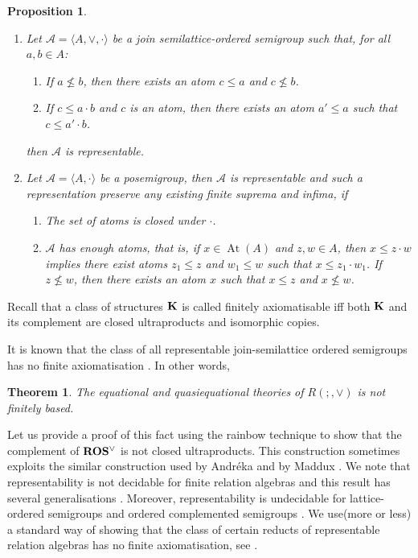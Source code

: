 \documentclass[a4paper]{article}
\theoremstyle{defin}
\theoremstyle{theorem}
\newtheorem{theorem}{Theorem}
\theoremstyle{prop}
\newtheorem{prop}{Proposition}
\theoremstyle{lemma}
\theoremstyle{ex}
\theoremstyle{col}
\begin{document}
\begin{prop}
  $ $

  \begin{enumerate}
    \item Let $\mathcal{A} = \langle A, \vee, \cdot \rangle$ be a join semilattice-ordered semigroup such that, for all $a, b \in A$:
    \begin{enumerate}
      \item If $a \nleq b$, then there exists an atom $c \leq a$ and $c \nleq b$.
      \item If $c \leq a \cdot b$ and $c$ is an atom, then there exists an atom $a' \leq a$ such that $c \leq a' \cdot b$.
    \end{enumerate}
    then $\mathcal{A}$ is representable.
    \item Let $\mathcal{A} = \langle A, \cdot \rangle$ be a posemigroup, then $\mathcal{A}$ is representable and such a representation preserve any existing finite suprema and infima, if
    \begin{enumerate}
      \item The set of atoms is closed under $\cdot$.
      \item $\mathcal{A}$ has enough atoms, that is, if $x \in \operatorname{At}(A)$ and $z, w \in A$, then $x \leq z \cdot w$ implies there exist atoms $z_1 \leq z$ and $w_1 \leq w$ such that $x \leq z_1 \cdot w_1$. If $z \nleq w$, then there exists an atom $x$ such that $x \leq z$ and $x \nleq w$.
    \end{enumerate}
  \end{enumerate}
\end{prop}

Recall that a class of structures ${\bf K}$ is called finitely axiomatisable iff both ${\bf K}$ and its complement are closed
ultraproducts and isomorphic copies.

It is known that the class of all representable join-semilattice ordered semigroups has no finite axiomatisation \cite{andreka1989union}. In other words,

\begin{theorem}
  The equational and quasiequational theories of $R(;,\vee)$ is not finitely based.
\end{theorem}

Let us provide a proof of this fact using the rainbow technique \cite{hirsch2002relation} to show that the complement of ${\bf ROS^{\vee}}$ is not closed ultraproducts. This construction sometimes exploits the similar construction used by Andr{\'e}ka \cite{andreka1991representations} and by Maddux \cite{maddux_1989}.
We note that representability is not decidable for finite relation algebras \cite{hirsch2001representability} and this result has several generalisations \cite{hirsch2012undecidability}. Moreover, representability is undecidable for lattice-ordered semigroups and ordered complemented semigroups \cite{neuzerling2016undecidability}. We use(more or less) a standard way of showing that the class of certain reducts of representable relation algebras has no finite axiomatisation, see \cite{hodkinson2000axiomatizability} \cite{hirsch1997step}.
\end{document}
